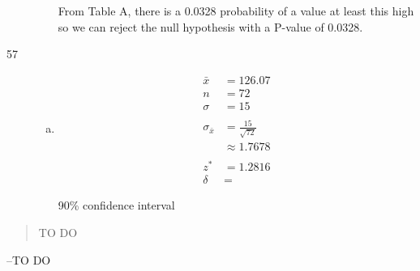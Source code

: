 \documentclass[letterpaper, landscape]{exam}
\begin{document}
\begin{description}
\begin{enumerate}[(a)]
            From Table A, there is a 0.0328 probability of a value at least this
            high so we can reject the null hypothesis with a P-value of 0.0328.

        \end{enumerate}

      \item[57]
        \begin{enumerate}[(a)]
          \item 
            \begin{align*}
              \bar{x} & = 126.07 \\
              n       & = 72 \\
              \sigma  & = 15 \\
              \\
              \sigma_{\bar{x}} & = \frac{15}{\sqrt{72}} \\
                               & \approx 1.7678 \\
                               \\
              z^* &= 1.2816 \\
              \delta &= 
            \end{align*}

            90\% confidence interval
        \end{enumerate}

  \end{description}

  \else
    \vspace{7 cm}
    \begin{quote}
      \begin{em}
        TO DO
      \end{em}
    \end{quote}
    \hspace{1 cm}--TO DO
  \fi
\end{document}
